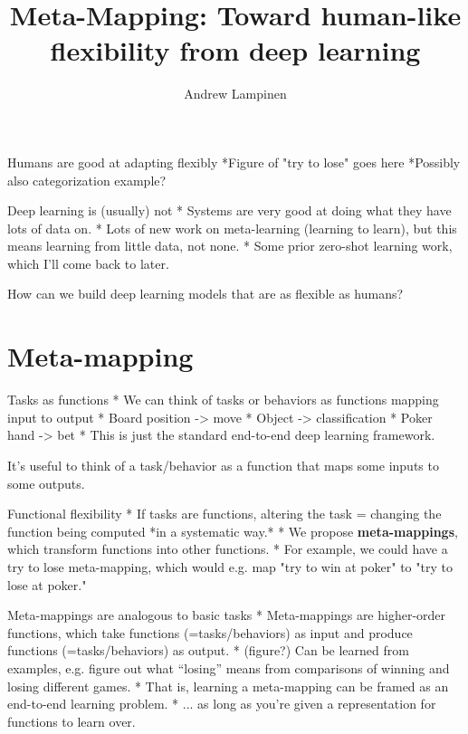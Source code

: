 \documentclass{beamer}
\begin{document}
\title{Meta-Mapping: Toward human-like flexibility from deep learning}
\author{Andrew Lampinen}
\date{}
\frame{\titlepage}

\begin{frame}{Humans are good at adapting flexibly}
*Figure of "try to lose" goes here
*Possibly also categorization example?
\end{frame}

\begin{frame}{Deep learning is (usually) not}
* Systems are very good at doing what they have lots of data on.
* Lots of new work on meta-learning (learning to learn), but this means learning from little data, not none.
* Some prior zero-shot learning work, which I'll come back to later.
\end{frame}

\begin{frame}[standout]
How can we build deep learning models that are as flexible as humans?
\end{frame}

\section{Meta-mapping}

\begin{frame}{Tasks as functions}
* We can think of tasks or behaviors as functions mapping input to output
    * Board position -> move
    * Object -> classification
    * Poker hand -> bet
* This is just the standard end-to-end deep learning framework.
\end{frame}

\begin{frame}[standout]
It's useful to think of a task/behavior as a function that maps some inputs to some outputs.
\end{frame}

\begin{frame}{Functional flexibility}
* If tasks are functions, altering the task = changing the function being computed *in a systematic way.*
* We propose \textbf{meta-mappings}, which transform functions into other functions.
* For example, we could have a try to lose meta-mapping, which would e.g. map "try to win at poker" to "try to lose at poker."
\end{frame}

\begin{frame}{Meta-mappings are analogous to basic tasks}
* Meta-mappings are higher-order functions, which take functions (=tasks/behaviors) as input and produce functions (=tasks/behaviors) as output.
* (figure?) Can be learned from examples, e.g. figure out what ``losing'' means from comparisons of winning and losing different games.
* That is, learning a meta-mapping can be framed as an end-to-end learning problem.
* ... as long as you're given a representation for functions to learn over.
\end{frame}
\end{document}
